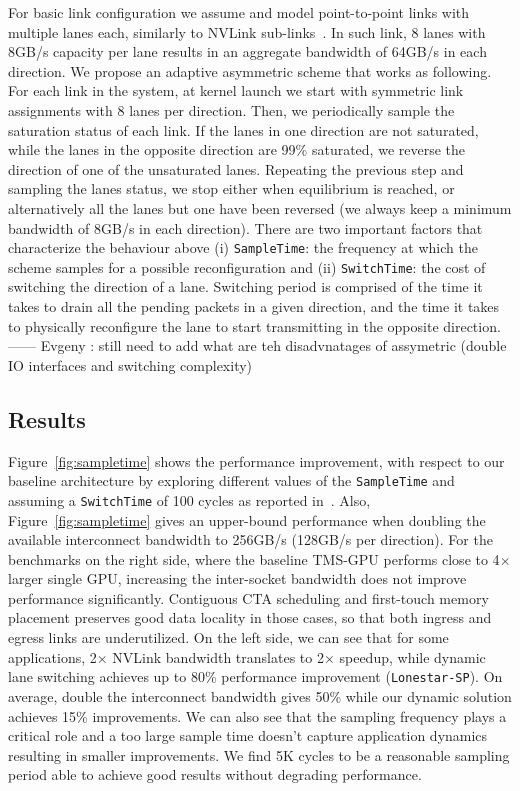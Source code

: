 For basic link configuration we assume and model point-to-point
links with multiple lanes each, similarly to NVLink
sub-links~\cite{pascal-tesla-wp}.  In such link, 8 lanes with 8GB/s capacity
per lane results in an aggregate bandwidth of 64GB/s in each direction. We
propose an adaptive asymmetric scheme that works as following. For each link
in the system, at kernel launch we start with symmetric link assignments with 8
lanes per direction. Then, we periodically sample the saturation
status of each link. If the lanes in one direction are not saturated, while the
lanes in the opposite direction are 99\% saturated, we reverse the direction of
one of the unsaturated lanes. Repeating the previous step and sampling the lanes
status, we stop either when equilibrium is reached, or alternatively all the 
lanes but one have been reversed (we always keep a minimum bandwidth of 8GB/s 
in each direction).  
There are two important factors that characterize the behaviour above (i) 
\texttt{SampleTime}: the frequency at which the scheme samples for a possible 
reconfiguration and (ii) \texttt{SwitchTime}: the cost of switching the 
direction of a lane. Switching period is comprised of the time it takes to 
drain all the pending packets in a given direction, and the time it takes to 
physically reconfigure the lane to start transmitting in the opposite 
direction. 
------  Evgeny : still need to add what are teh disadvnatages of assymetric
(double IO interfaces and switching complexity)



\subsection{Results}
Figure~\ref{fig:sampletime} shows the performance improvement, with respect 
to our baseline architecture by exploring different values of the 
\texttt{SampleTime} and assuming a \texttt{SwitchTime} of 100 cycles as 
reported in~\cite{XXX}. Also, Figure~\ref{fig:sampletime} 
gives an upper-bound performance when doubling the available interconnect 
bandwidth to 256GB/s (128GB/s per direction). For the benchmarks on the right 
side, where the baseline TMS-GPU performs close to 4$\times$ larger single 
GPU, increasing the inter-socket bandwidth does not improve performance 
significantly. Contiguous CTA scheduling and first-touch memory placement 
preserves good data locality in those cases, so that both ingress and egress 
links are underutilized. On the left side, we can see that for some 
applications, 2$\times$ NVLink bandwidth translates to 2$\times$ speedup, 
while dynamic lane switching achieves up to 80\% performance improvement 
(\texttt{Lonestar-SP}). On average, double the interconnect bandwidth gives 
50\% while our dynamic solution achieves 15\% improvements. We can also see 
that the sampling frequency plays a critical role and a too large sample time 
doesn't capture application dynamics resulting in smaller improvements. We 
find 5K cycles to be a reasonable sampling period able to achieve good 
results without degrading performance.

